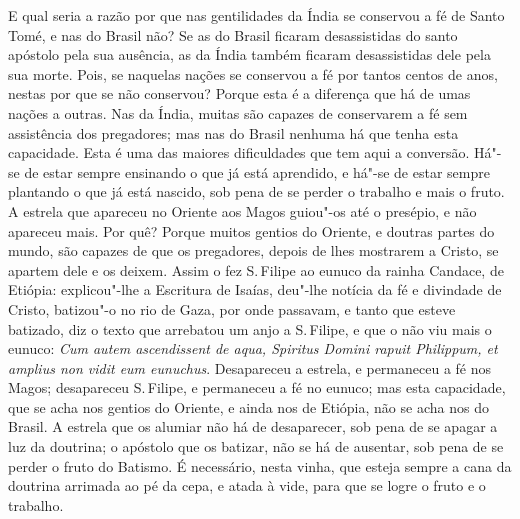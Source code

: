 E qual seria a razão por que nas gentilidades da Índia se conservou a fé
de Santo Tomé, e nas do Brasil não? Se as do Brasil ficaram
desassistidas do santo apóstolo pela sua ausência, as da Índia também
ficaram desassistidas dele pela sua morte. Pois, se naquelas nações se
conservou a fé por tantos centos de anos, nestas por que se não
conservou? Porque esta é a diferença que há de umas nações a outras. Nas
da Índia, muitas são capazes de conservarem a fé sem assistência dos
pregadores; mas nas do Brasil nenhuma há que tenha esta capacidade. Esta
é uma das maiores dificuldades que tem aqui a conversão. Há"- se de estar
sempre ensinando o que já está aprendido, e há"-se de estar sempre
plantando o que já está nascido, sob pena de se perder o trabalho e mais
o fruto. A estrela que apareceu no Oriente aos Magos guiou"-os até o
presépio, e não apareceu mais. Por quê? Porque muitos gentios do
Oriente, e doutras partes do mundo, são capazes de que os pregadores,
depois de lhes mostrarem a Cristo, se apartem dele e os deixem. Assim o
fez S.\,Filipe ao eunuco da rainha Candace, de Etiópia: explicou"-lhe a
Escritura de Isaías, deu"-lhe notícia da fé e divindade de Cristo,
batizou"-o no rio de Gaza, por onde passavam, e tanto que esteve
batizado, diz o texto que arrebatou um anjo a S.\,Filipe, e que o não viu
mais o eunuco: \emph{Cum autem ascendissent de aqua, Spiritus Domini
rapuit Philippum, et amplius non vidit eum eunuchus}. %
Desapareceu a estrela, e permaneceu a fé nos Magos; desapareceu S.\,Filipe, e permaneceu a fé no eunuco; mas esta capacidade, que se acha
nos gentios do Oriente, e ainda nos de Etiópia, não se acha nos do
Brasil. A estrela que os alumiar não há de desaparecer, sob pena de se
apagar a luz da doutrina; o apóstolo que os batizar, não se há de
ausentar, sob pena de se perder o fruto do Batismo. É necessário, nesta
vinha, que esteja sempre a cana da doutrina arrimada ao pé da cepa, e
atada à vide, para que se logre o fruto e o trabalho.

